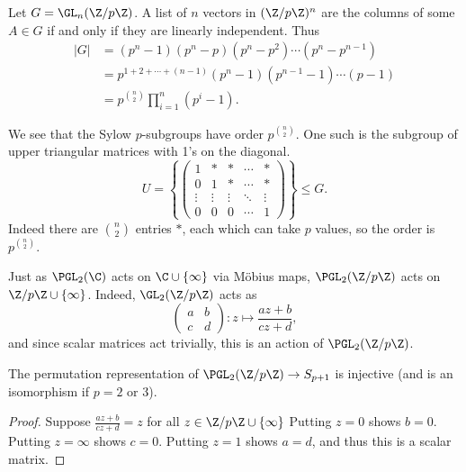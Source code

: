 \begin{example}
	Let $G = \GL_n(\Z/p\Z)$. A list of $n$ vectors in $(\Z/p\Z)^n$ are the columns of some $A \in G$ if and only if they are linearly independent.
	Thus
	\begin{align*}
		|G| &= (p^n - 1)(p^n - p)(p^n - p^2) \cdots (p^n - p^{n - 1}) \\
		&= p^{1 + 2 + \cdots + (n - 1)}(p^n - 1)(p^{n - 1} - 1) \cdots (p - 1) \\
		&= p^{\binom{n}{2}} \prod_{i = 1}^n (p^i - 1).
	\end{align*}

	We see that the Sylow $p$-subgroups have order $p^{\binom{n}{2}}$. One such is the subgroup of upper triangular matrices with 1's on the diagonal.
	$$
	U = \left\{\begin{pmatrix}
		1 & * & * & \cdots & * \\
		0 & 1 & * & \cdots & * \\
		\vdots  &\vdots   & \vdots & \ddots &\vdots \\
		0 & 0 & 0 & \cdots & 1
	\end{pmatrix}\right\} \leq G.
	$$
	Indeed there are $\binom{n}{2}$ entries $*$, each which can take $p$ values, so the order is $p^{\binom{n}{2}}$.
\end{example}

Just as $\PGL_2(\C)$ acts on $\C \cup \{\infty\}$ via Möbius maps, $\PGL_2(\Z/p\Z)$ acts on $\Z/p\Z \cup \{\infty\}$.
Indeed, $\GL_2(\Z/p\Z)$ acts as
$$
\begin{pmatrix}
	a & b\\
	c & d
\end{pmatrix}: z \longmapsto \frac{az + b}{cz + d},
$$
and since scalar matrices act trivially, this is an action of $\PGL_2(\Z/p\Z)$.

\begin{lemma}
	The permutation representation of $\PGL_2(\Z/p\Z) \rightarrow S_{p + 1}$ is injective (and is an isomorphism if $p = 2$ or 3).
\end{lemma}
\begin{proof}
	Suppose $\frac{az + b}{cz + d} = z$ for all $z \in \Z/p\Z \cup \{\infty\}$ Putting $z = 0$ shows $b = 0$. Putting $z = \infty$ shows $c = 0$. Putting $z = 1$ shows $a = d$, and thus this is a scalar matrix. 
\end{proof}

